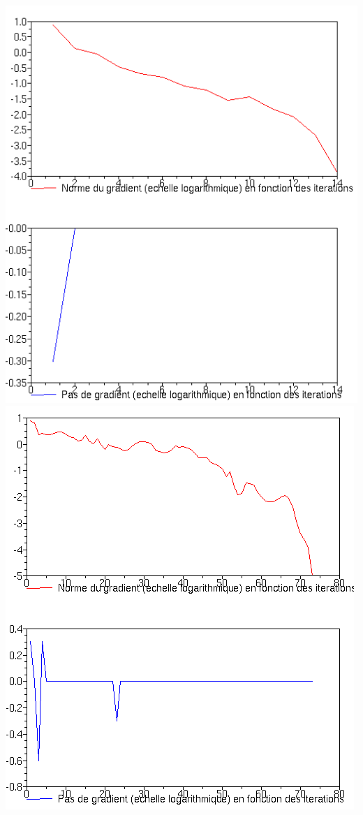 \documentclass[12pt, letterpaper]{article}
\begin{document}
\includegraphics[scale=0.5]{newton.png} \\
\includegraphics[scale=0.5]{BGFS.png}
\end{document}
